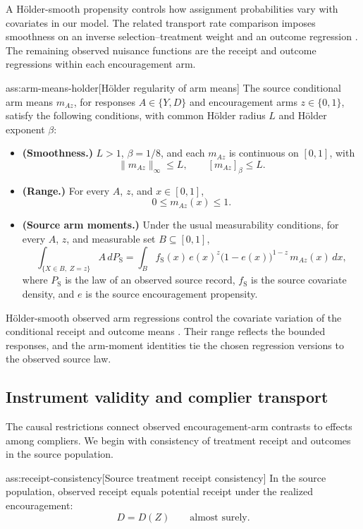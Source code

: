 A Hölder-smooth propensity controls how assignment probabilities vary with covariates in our model. The related transport rate comparison imposes smoothness on an inverse selection--treatment weight and an outcome regression \citep{ZengKennedyBodnarNaimi2025Efficient}. The remaining observed nuisance functions are the receipt and outcome regressions within each encouragement arm.

\begin{assumptionv}{ass:arm-means-holder}[Hölder regularity of arm means]
The source conditional arm means \(m_{Az}\), for responses \(A\in\{Y,D\}\) and encouragement arms \(z\in\{0,1\}\), satisfy the following conditions, with common Hölder radius \(L\) and Hölder exponent \(\beta\):
\begin{itemize}
\item \textbf{(Smoothness.)} \(L>1\), \(\beta=1/8\), and each \(m_{Az}\) is continuous on \([0,1]\), with
\[
\lVert m_{Az}\rVert_\infty\le L,
\qquad
[m_{Az}]_\beta\le L.
\]
\item \textbf{(Range.)} For every \(A\), \(z\), and \(x\in[0,1]\),
\[
0\le m_{Az}(x)\le 1.
\]
\item \textbf{(Source arm moments.)} Under the usual measurability conditions, for every \(A\), \(z\), and measurable set \(B\subseteq[0,1]\),
\[
\int_{\{X\in B,\;Z=z\}} A\,dP_{\mathrm S}
=
\int_B f_{\mathrm S}(x)\,
e(x)^z\bigl(1-e(x)\bigr)^{1-z}\,
m_{Az}(x)\,dx,
\]
where \(P_{\mathrm S}\) is the law of an observed source record, \(f_{\mathrm S}\) is the source covariate density, and \(e\) is the source encouragement propensity.
\end{itemize}
\end{assumptionv}

Hölder-smooth observed arm regressions control the covariate variation of the conditional receipt and outcome means \citep{ZengKennedyBodnarNaimi2025Efficient}. Their range reflects the bounded responses, and the arm-moment identities tie the chosen regression versions to the observed source law.

\subsection{Instrument validity and complier transport}

The causal restrictions connect observed encouragement-arm contrasts to effects among compliers. We begin with consistency of treatment receipt and outcomes in the source population.

\begin{assumptionv}{ass:receipt-consistency}[Source treatment receipt consistency]
In the source population, observed receipt equals potential receipt under the realized encouragement:
\[
D=D(Z)\qquad\text{almost surely}.
\]
\end{assumptionv}

